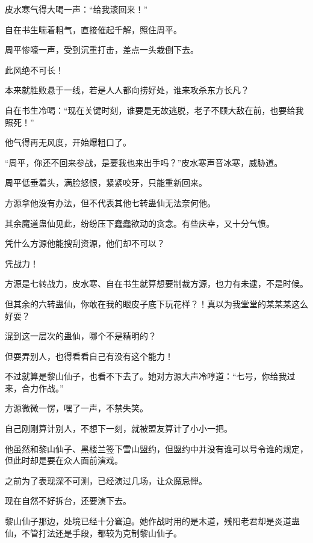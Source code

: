 \begin{this_body}
皮水寒气得大喝一声：“给我滚回来！”

自在书生喘着粗气，直接催起千解，照住周平。

周平惨嚎一声，受到沉重打击，差点一头栽倒下去。

此风绝不可长！

本来就胜败悬于一线，若是人人都向捞好处，谁来攻杀东方长凡？

自在书生冷喝：“现在关键时刻，谁要是无故逃脱，老子不顾大敌在前，也要给我照死！”

他气得再无风度，开始爆粗口了。

“周平，你还不回来参战，是要我也来出手吗？”皮水寒声音冰寒，威胁道。

周平低垂着头，满脸怒恨，紧紧咬牙，只能重新回来。

方源拿他没有办法，但不代表其他七转蛊仙无法奈何他。

其余魔道蛊仙见此，纷纷压下蠢蠢欲动的贪念。有些庆幸，又十分气愤。

凭什么方源他能搜刮资源，他们却不可以？

凭战力！

方源是七转战力，皮水寒、自在书生就算想要制裁方源，也力有未逮，不是时候。

但其余的六转蛊仙，你敢在我的眼皮子底下玩花样？！真以为我堂堂的某某某这么好耍？

混到这一层次的蛊仙，哪个不是精明的？

但耍弄别人，也得看看自己有没有这个能力！

不过就算是黎山仙子，也看不下去了。她对方源大声冷哼道：“七号，你给我过来，合力作战。”

方源微微一愣，嘿了一声，不禁失笑。

自己刚刚算计别人，不想下一刻，就被盟友算计了小小一把。

他虽然和黎山仙子、黑楼兰签下雪山盟约，但盟约中并没有谁可以号令谁的规定，但此时却是要在众人面前演戏。

之前为了表现深不可测，已经演过几场，让众魔忌惮。

现在自然不好拆台，还要演下去。

黎山仙子那边，处境已经十分窘迫。她作战时用的是木道，残阳老君却是炎道蛊仙，不管打法还是手段，都较为克制黎山仙子。

\end{this_body}

